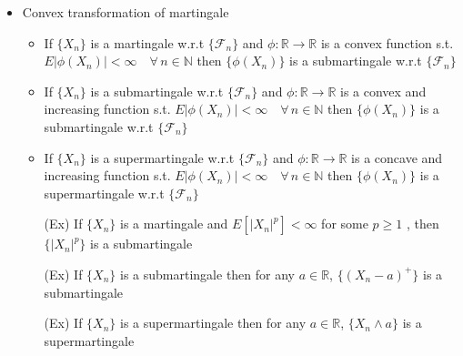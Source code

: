 \documentclass[12pt, A4]{article}
\newcommand{\N}{\mathbb{N}}
\newcommand{\R}{\mathbb{R}}
\newcommand{\F}{\mathcal{F}}
\newcommand{\foranyn}{\quad \forall \, n\in \N}
\begin{document}
\begin{itemize}
\begin{itemize}
	\end{itemize}
\clearpage
	\item Convex transformation of martingale
	\begin{itemize}
		\item If $\{X_n\}$ is a martingale w.r.t $\{\F_n\}$ and $\phi:\R\rightarrow \R$ is a convex function s.t. \\$E|\phi(X_n)|<\infty\foranyn$ then $\{\phi(X_n)\}$ is a submartingale w.r.t $\{\F_n\}$
		\item If $\{X_n\}$ is a submartingale w.r.t $\{\F_n\}$ and $\phi:\R\rightarrow \R$ is a convex and increasing function s.t. $E|\phi(X_n)|<\infty\foranyn$ then $\{\phi(X_n)\}$ is a submartingale w.r.t $\{\F_n\}$
		\item If $\{X_n\}$ is a supermartingale w.r.t $\{\F_n\}$ and $\phi:\R\rightarrow \R$ is a concave and increasing function s.t. $E|\phi(X_n)|<\infty\foranyn$ then $\{\phi(X_n)\}$ is a supermartingale w.r.t $\{\F_n\}$
		\item[(Ex)] If $\{X_n\}$ is a martingale and $E[|X_n|^p]<\infty$ for some $p\geq1$ , then $\{|X_n|^p\}$ is a submartingale
		\item[(Ex)] If $\{X_n\}$ is a submartingale then for any $a\in \R$, $\{(X_n-a)^+\}$ is a submartingale 
		\item[(Ex)] If $\{X_n\}$ is a supermartingale then for any $a\in \R$, $\{X_n\wedge a\}$ is a supermartingale 
	\end{itemize}


\end{itemize}
\end{document}
